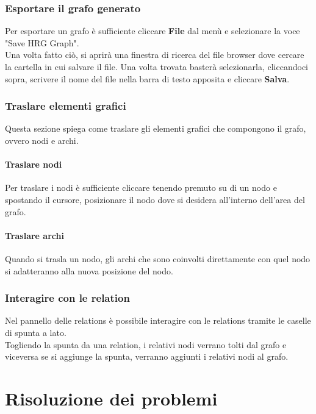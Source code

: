 \documentclass[openany,12pt,a4paper]{report}
\begin{document}
	\subsection{Esportare il grafo generato}
	Per esportare un grafo è sufficiente cliccare \textbf{File} dal menù e selezionare la voce "Save HRG Graph".\\
	Una volta fatto ciò, si aprirà una finestra di ricerca del file browser dove cercare la cartella in cui salvare il file. Una volta trovata basterà selezionarla, cliccandoci sopra, scrivere il nome del file nella barra di testo apposita e cliccare \textbf{Salva}.\\
	
	\subsection{Traslare elementi grafici}
	Questa sezione spiega come traslare gli elementi grafici che compongono il grafo, ovvero nodi e archi.
	
	\subsubsection{Traslare nodi}
	Per traslare i nodi è sufficiente cliccare tenendo premuto su di un nodo e spostando il cursore, posizionare il nodo dove si desidera all'interno dell'area del grafo.
	
	\subsubsection{Traslare archi}
	Quando si trasla un nodo, gli archi che sono coinvolti direttamente con quel nodo si adatteranno alla nuova posizione del nodo.
	
	\subsection{Interagire con le relation}
	Nel pannello delle relations è possibile interagire con le relations tramite le caselle di spunta a lato.\\
	Togliendo la spunta da una relation, i relativi nodi verrano tolti dal grafo e viceversa se si aggiunge la spunta, verranno aggiunti i relativi nodi al grafo.
	
	\chapter{Risoluzione dei problemi}
	
\end{document}
